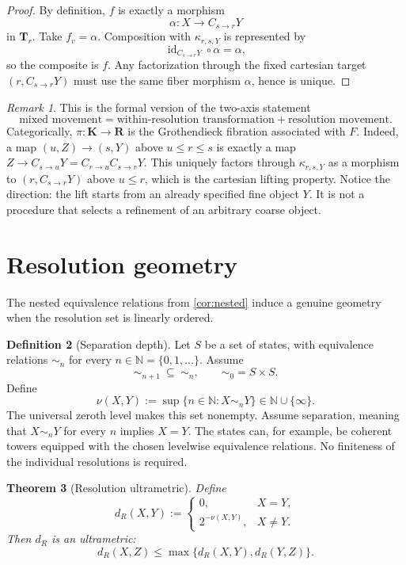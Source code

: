 \documentclass[11pt]{article}
\newtheorem{theorem}{Theorem}[section]
\theoremstyle{definition}
\newtheorem{definition}[theorem]{Definition}
\theoremstyle{remark}
\newtheorem{remark}[theorem]{Remark}
\newcommand{\K}{\mathbf K}
\newcommand{\Rcat}{\mathbf R}
\newcommand{\Tcat}{\mathbf T}
\newcommand{\id}{\operatorname{id}}
\begin{document}
\begin{proof}
By definition, $f$ is exactly a morphism
\[
\alpha:X\to C_{s\to r}Y
\]
in $\Tcat_r$. Take $f_v=\alpha$. Composition with $\kappa_{r,s,Y}$ is represented by
\[
\id_{C_{s\to r}Y}\circ\alpha=\alpha,
\]
so the composite is $f$. Any factorization through the fixed cartesian target $(r,C_{s\to r}Y)$ must use the same fiber morphism $\alpha$, hence is unique.
\end{proof}

\begin{remark}
This is the formal version of the two-axis statement
\[
\boxed{
\text{mixed movement}
=
\text{within-resolution transformation}
+
\text{resolution movement}.
}
\]
Categorically, $\pi:\K\to\Rcat$ is the Grothendieck fibration associated with $F$. Indeed, a map $(u,Z)\to(s,Y)$ above $u\le r\le s$ is exactly a map $Z\to C_{s\to u}Y=C_{r\to u}C_{s\to r}Y$. This uniquely factors through $\kappa_{r,s,Y}$ as a morphism to $(r,C_{s\to r}Y)$ above $u\le r$, which is the cartesian lifting property. Notice the direction: the lift starts from an already specified fine object $Y$. It is not a procedure that selects a refinement of an arbitrary coarse object.
\end{remark}

\section{Resolution geometry}

The nested equivalence relations from \cref{cor:nested} induce a genuine geometry when the resolution set is linearly ordered.

\begin{definition}[Separation depth]
Let $S$ be a set of states, with equivalence relations $\sim_n$ for every $n\in\mathbb N=\{0,1,\ldots\}$. Assume
\[
\sim_{n+1}\ \subseteq\ \sim_n,
\qquad \sim_0=S\times S.
\]
Define
\[
\nu(X,Y):=\sup\{n\in\mathbb N:X\sim_nY\}\in\mathbb N\cup\{\infty\}.
\]
The universal zeroth level makes this set nonempty. Assume separation, meaning that $X\sim_nY$ for every $n$ implies $X=Y$. The states can, for example, be coherent towers equipped with the chosen levelwise equivalence relations. No finiteness of the individual resolutions is required.
\end{definition}

\begin{theorem}[Resolution ultrametric]\label{thm:ultrametric}
Define
\[
d_R(X,Y):=
\begin{cases}
0,&X=Y,\\
2^{-\nu(X,Y)},&X\ne Y.
\end{cases}
\]
Then $d_R$ is an ultrametric:
\[
d_R(X,Z)\le\max\{d_R(X,Y),d_R(Y,Z)\}.
\]
\end{theorem}
\end{document}
